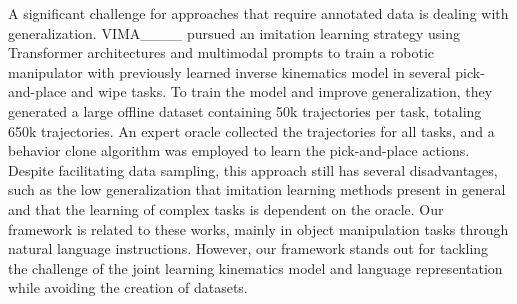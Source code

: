 A significant challenge for approaches that require annotated data is dealing with generalization. VIMA____ pursued an imitation learning strategy using Transformer architectures and multimodal prompts to train a robotic manipulator with previously learned inverse kinematics model in several pick-and-place and wipe tasks. To train the model and improve generalization, they generated a large offline dataset containing 50k trajectories per task, totaling 650k trajectories. An expert oracle collected the trajectories for all tasks, and a behavior clone algorithm was employed to learn the pick-and-place actions. Despite facilitating data sampling, this approach still has several disadvantages, such as the low generalization that imitation learning methods present in general and that the learning of complex tasks is dependent on the oracle. Our framework is related to these works, mainly in object manipulation tasks through natural language instructions. However, our framework stands out for tackling the challenge of the joint learning kinematics model and language representation while avoiding the creation of datasets.